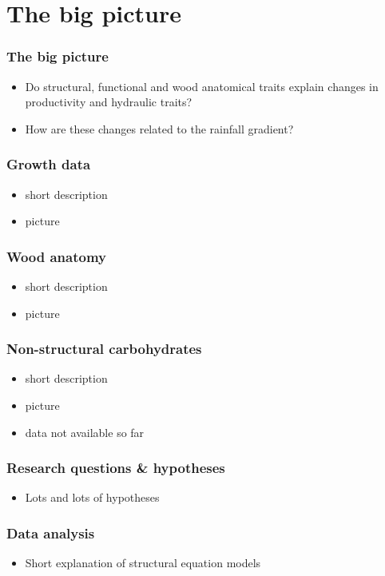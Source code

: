 \documentclass[usepdftitle=false]{beamer}
\begin{document}
\section{The big picture}
\begin{frame}
	\frametitle{The big picture}
	\begin{itemize}
		\item Do structural, functional and wood anatomical traits explain changes in productivity and hydraulic traits? 
		\item How are these changes related to the rainfall gradient?
	\end{itemize}
\end{frame}

\begin{frame}
	\frametitle{Growth data}
	\begin{itemize}
		\item short description
		\item picture
	\end{itemize}
\end{frame}

\begin{frame}
	\frametitle{Wood anatomy}
	\begin{itemize}
		\item short description
		\item picture
	\end{itemize}
\end{frame}

\begin{frame}
	\frametitle{Non-structural carbohydrates}
	\begin{itemize}
		\item short description
		\item picture
		\item data not available so far
	\end{itemize}
\end{frame}

\begin{frame}
	\frametitle{Research questions \& hypotheses}
	\begin{itemize}
		\item Lots and lots of hypotheses
	\end{itemize}
\end{frame}

\begin{frame}
	\frametitle{Data analysis}
	\begin{itemize}
		\item Short explanation of structural equation models		
	\end{itemize}
\end{frame}
\end{document}
